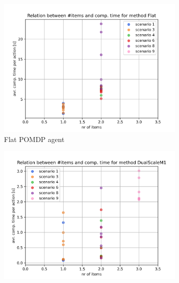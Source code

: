 \begin{figure}[h]
    \centering
    \begin{subfigure}[b]{0.49\textwidth}
        \includegraphics[width=\textwidth]{Report/images/nr_of_items/items_vs_comptime_Flat.png}
        \caption{Flat POMDP agent}
        \label{subfig:nr_of_items_Flat}
    \end{subfigure}
    \begin{subfigure}[b]{0.49\textwidth}
         \includegraphics[width=\textwidth]{Report/images/nr_of_items/items_vs_comptime_DualScaleM1.png}

\end{subfigure}
\end{figure}
